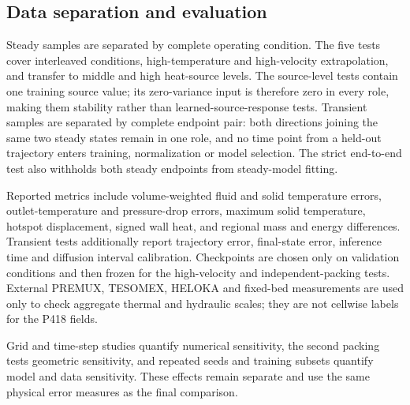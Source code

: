 \subsection{Data separation and evaluation}

Steady samples are separated by complete operating condition. The five tests
cover interleaved conditions, high-temperature and high-velocity
extrapolation, and transfer to middle and high heat-source levels. The
source-level tests contain one training source value; its zero-variance input
is therefore zero in every role, making them stability rather than
learned-source-response tests. Transient samples are separated by complete
endpoint pair: both directions joining the
same two steady states remain in one role, and no time point from a held-out
trajectory enters training, normalization or model selection. The strict
end-to-end test also withholds both steady endpoints from steady-model fitting.

Reported metrics include volume-weighted fluid and solid temperature errors,
outlet-temperature and pressure-drop errors, maximum solid temperature,
hotspot displacement, signed wall heat, and regional mass and energy
differences. Transient tests additionally report trajectory error, final-state
error, inference time and diffusion interval calibration. Checkpoints are chosen only
on validation conditions and then frozen for the high-velocity
and independent-packing tests. External PREMUX, TESOMEX, HELOKA and fixed-bed
measurements are used only to check aggregate thermal and hydraulic scales;
they are not cellwise labels for the P418 fields.

Grid and time-step studies quantify numerical sensitivity, the second packing
tests geometric sensitivity, and repeated seeds and training subsets quantify
model and data sensitivity. These effects remain separate and use the same
physical error measures as the final comparison.
